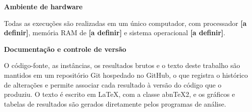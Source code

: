 \begin{alineas}
	\item \textbf{Ambiente de hardware}

	Todas as execuções são realizadas em um único computador, com processador
	\textbf{[a definir]}, memória RAM de \textbf{[a definir]} e sistema operacional
	\textbf{[a definir]}.

	\item \textbf{Documentação e controle de versão}

	O código-fonte, as instâncias, os resultados brutos e o texto deste trabalho são
	mantidos em um repositório Git hospedado no GitHub, o que registra o histórico de
	alterações e permite associar cada resultado à versão do código que o produziu. O
	texto é escrito em \LaTeX{}, com a classe abn\TeX{}2, e os gráficos e tabelas de
	resultados são gerados diretamente pelos programas de análise.
\end{alineas}
